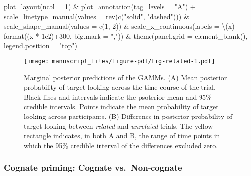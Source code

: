 \documentclass[
  letterpaper,
  DIV=11,
  numbers=noendperiod]{scrartcl}
\newenvironment{Shaded}{\begin{snugshade}}{\end{snugshade}}
\newcommand{\AttributeTok}[1]{\textcolor[rgb]{0.40,0.45,0.13}{#1}}
\newcommand{\DecValTok}[1]{\textcolor[rgb]{0.68,0.00,0.00}{#1}}
\newcommand{\FloatTok}[1]{\textcolor[rgb]{0.68,0.00,0.00}{#1}}
\newcommand{\FunctionTok}[1]{\textcolor[rgb]{0.28,0.35,0.67}{#1}}
\newcommand{\NormalTok}[1]{\textcolor[rgb]{0.00,0.23,0.31}{#1}}
\newcommand{\SpecialCharTok}[1]{\textcolor[rgb]{0.37,0.37,0.37}{#1}}
\newcommand{\StringTok}[1]{\textcolor[rgb]{0.13,0.47,0.30}{#1}}
\begin{document}
\begin{Shaded}
\begin{Highlighting}[]
    \FunctionTok{plot\_layout}\NormalTok{(}\AttributeTok{ncol =} \DecValTok{1}\NormalTok{) }\SpecialCharTok{\&}
    \FunctionTok{plot\_annotation}\NormalTok{(}\AttributeTok{tag\_levels =} \StringTok{"A"}\NormalTok{) }\SpecialCharTok{+}
    \FunctionTok{scale\_linetype\_manual}\NormalTok{(}\AttributeTok{values =} \FunctionTok{rev}\NormalTok{(}\FunctionTok{c}\NormalTok{(}\StringTok{"solid"}\NormalTok{, }\StringTok{"dashed"}\NormalTok{))) }\SpecialCharTok{\&}
    \FunctionTok{scale\_shape\_manual}\NormalTok{(}\AttributeTok{values =} \FunctionTok{c}\NormalTok{(}\DecValTok{1}\NormalTok{, }\DecValTok{2}\NormalTok{)) }\SpecialCharTok{\&}
    \FunctionTok{scale\_x\_continuous}\NormalTok{(}\AttributeTok{labels =}\NormalTok{ \textbackslash{}(x) }\FunctionTok{format}\NormalTok{((x }\SpecialCharTok{*} \FloatTok{1e2}\NormalTok{)}\SpecialCharTok{+}\DecValTok{300}\NormalTok{, }
                                            \AttributeTok{big.mark =} \StringTok{","}\NormalTok{)) }\SpecialCharTok{\&}
    \FunctionTok{theme}\NormalTok{(}\AttributeTok{panel.grid =} \FunctionTok{element\_blank}\NormalTok{(),}
          \AttributeTok{legend.position =} \StringTok{"top"}\NormalTok{) }
\end{Highlighting}
\end{Shaded}

\begin{figure}[H]

{\centering \texttt{[image: manuscript\_files/figure-pdf/fig-related-1.pdf]}

}

\caption{\label{fig-related}Marginal posterior predictions of the GAMMs.
(A) Mean posterior probability of target looking across the time course
of the trial. Black lines and intervals indicate the psoterior mean and
95\% credible intervals. Points indicate the mean probability of target
looking across participants. (B) Difference in posterior probability of
target looking between \emph{related} and \emph{unrelated} trials. The
yellow rectangle indicates, in both A and B, the range of time points in
which the 95\% credible interval of the differences excluded zero.}

\end{figure}

\hypertarget{cognate-priming-cognate-vs.-non-cognate}{%
\subsubsection{Cognate priming: Cognate
vs.~Non-cognate}\label{cognate-priming-cognate-vs.-non-cognate}}
\end{document}
